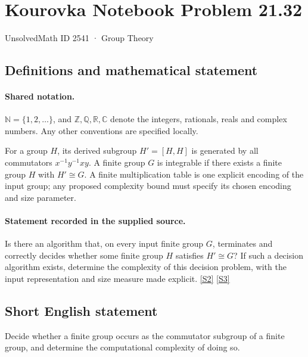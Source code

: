 \documentclass[11pt]{article}
\newcommand{\sref}[2]{\hyperlink{source:#1:#2}{[S#2]}}
\begin{document}
\setcounter{section}{2540}
\section{Kourovka Notebook Problem 21.32}\label{2541}
{\small\sffamily UnsolvedMath ID 2541 · Group Theory}
\subsection{Definitions and mathematical statement}

\paragraph{Shared notation.}$\mathbb N=\{1,2,\ldots\}$, and $\mathbb Z,\mathbb Q,\mathbb R,\mathbb C$ denote the integers, rationals, reals and complex numbers. Any other conventions are specified locally.


For a group $H$, its derived subgroup $H'=[H,H]$ is generated by all commutators $x^{-1}y^{-1}xy$. A finite group $G$ is integrable if there exists a finite group $H$ with $H'\cong G$. A finite multiplication table is one explicit encoding of the input group; any proposed complexity bound must specify its chosen encoding and size parameter.
\paragraph{Statement recorded in the supplied source.}
Is there an algorithm that, on every input finite group $G$, terminates and correctly decides whether some finite group $H$ satisfies $H'\cong G$? If such a decision algorithm exists, determine the complexity of this decision problem, with the input representation and size measure made explicit. \sref{2541}{2} \sref{2541}{3}
\subsection{Short English statement}
Decide whether a finite group occurs as the commutator subgroup of a finite group, and determine the computational complexity of doing so.
\end{document}
